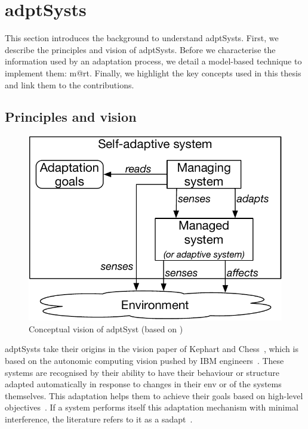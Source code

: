 \section[Adaptive systems]{\Glspl{adptSyst}}
\label{sec:back:adapt-syst}

This section introduces the background to understand \glspl{adptSyst}.
First, we describe the principles and vision of \glspl{adptSyst}.
Before we characterise the information used by an adaptation process, we detail a model-based technique to implement them: \gls{m@rt}.
Finally, we highlight the key concepts used in this thesis and link them to the contributions.

\subsection{Principles and vision}
\begin{figure}
	\centering
	\includegraphics[width=0.5\linewidth]{img/chapt-background/adptSyst/vision}
	\caption{Conceptual vision of \gls{adptSyst} (based on \cite{DBLP:books/sp/19/Weyns19})}
	\label{fig:background:adptSyst:principles}
\end{figure}


\Glspl{adptSyst} take their origins in the vision paper of Kephart and \linebreak Chess~\cite{DBLP:journals/computer/KephartC03}, which is based on the autonomic computing vision pushed by IBM engineers~\cite{computing2006architectural}.
These systems are recognised by their ability to have their behaviour or structure adapted automatically in response to changes in their \gls{env} or of the systems themselves.
This adaptation helps them to achieve their goals based on high-level objectives~\cite{DBLP:conf/dagstuhl/ChengLGIMABBBCSDFGGGKKKLMMMPSTTWW09}.
If a system performs itself this adaptation mechanism with minimal interference, the literature refers to it as a \gls{sadapt}~\cite{DBLP:conf/dagstuhl/BrunSGGKLMPS09}.

